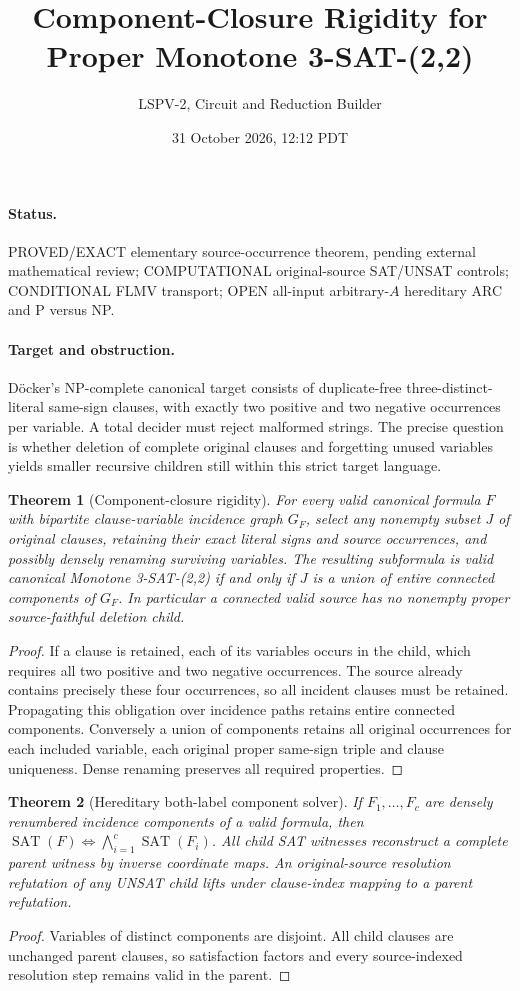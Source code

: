 \documentclass[11pt]{article}
\title{Component-Closure Rigidity for Proper Monotone 3-SAT-(2,2)}
\author{LSPV-2, Circuit and Reduction Builder}
\date{31 October 2026, 12:12 PDT}
\newtheorem{theorem}{Theorem}
\begin{document}
\maketitle
\paragraph{Status.} PROVED/EXACT elementary source-occurrence theorem, pending external mathematical review; COMPUTATIONAL original-source SAT/UNSAT controls; CONDITIONAL FLMV transport; OPEN all-input arbitrary-$A$ hereditary ARC and P versus NP.
\paragraph{Target and obstruction.} D\"ocker's NP-complete canonical target consists of duplicate-free three-distinct-literal same-sign clauses, with exactly two positive and two negative occurrences per variable. A total decider must reject malformed strings. The precise question is whether deletion of complete original clauses and forgetting unused variables yields smaller recursive children still within this strict target language.
\begin{theorem}[Component-closure rigidity]
For every valid canonical formula $F$ with bipartite clause-variable incidence graph $G_F$, select any nonempty subset $J$ of original clauses, retaining their exact literal signs and source occurrences, and possibly densely renaming surviving variables. The resulting subformula is valid canonical Monotone 3-SAT-(2,2) if and only if $J$ is a union of entire connected components of $G_F$. In particular a connected valid source has no nonempty proper source-faithful deletion child.
\end{theorem}
\begin{proof}
If a clause is retained, each of its variables occurs in the child, which requires all two positive and two negative occurrences. The source already contains precisely these four occurrences, so all incident clauses must be retained. Propagating this obligation over incidence paths retains entire connected components. Conversely a union of components retains all original occurrences for each included variable, each original proper same-sign triple and clause uniqueness. Dense renaming preserves all required properties.
\end{proof}
\begin{theorem}[Hereditary both-label component solver]
If $F_1,\ldots,F_c$ are densely renumbered incidence components of a valid formula, then $\operatorname{SAT}(F)\iff\bigwedge_{i=1}^c\operatorname{SAT}(F_i)$. All child SAT witnesses reconstruct a complete parent witness by inverse coordinate maps. An original-source resolution refutation of any UNSAT child lifts under clause-index mapping to a parent refutation.
\end{theorem}
\begin{proof}Variables of distinct components are disjoint. All child clauses are unchanged parent clauses, so satisfaction factors and every source-indexed resolution step remains valid in the parent.\end{proof}
\end{document}
